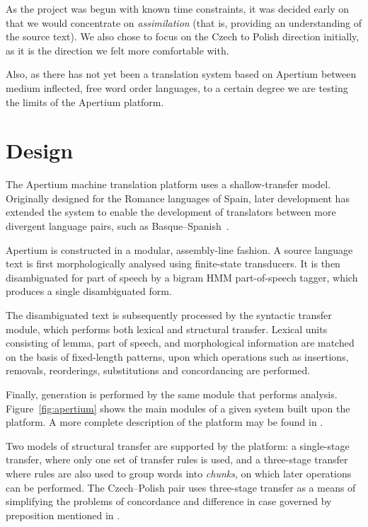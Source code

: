 \documentclass[11pt]{article}
\begin{document}
As the project was begun with known time constraints, it was decided early on that we would 
concentrate on \emph{assimilation} (that is, providing an understanding of the source text). 
We also chose to focus on the Czech to Polish direction initially, as it is the direction 
we felt more comfortable with. 

Also, as there has not yet been a translation system based on Apertium between
medium inflected, free word order languages, to a certain degree we are testing
the limits of the Apertium platform.

\section{Design}
The Apertium machine translation platform uses a shallow-transfer model.
Originally designed for the Romance languages of Spain, later development has
extended the system to enable the development of translators between more
divergent language pairs, such as Basque--Spanish~\citep{ginestirosell09}.

Apertium is constructed in a modular, assembly-line fashion. 
A source language text is first morphologically analysed using finite-state 
transducers. It is then disambiguated for part of speech by a bigram HMM 
part-of-speech tagger, which produces a single disambiguated form.

The disambiguated text is subsequently processed by the syntactic transfer
module, which performs both lexical and structural transfer. Lexical units
consisting of lemma, part of speech, and morphological information are 
matched on the basis of fixed-length patterns, upon which operations such
as insertions, removals, reorderings, substitutions and concordancing are
performed.

Finally, generation
is performed by the same module that performs analysis. Figure~\ref{fig:apertium}
shows the main modules of a given system built upon the platform. A more complete description
of the platform may be found in \citet{armentano06p}.

Two models of structural transfer are supported by the platform: a single-stage transfer, where only
one set of transfer rules is used, and a three-stage transfer where rules are also used to 
group words into \emph{chunks}, on which later operations can be performed. The Czech--Polish
pair uses three-stage transfer as a means of simplifying the problems of concordance
and difference in case governed by preposition mentioned in \cite{Debowski02}.
\end{document}
